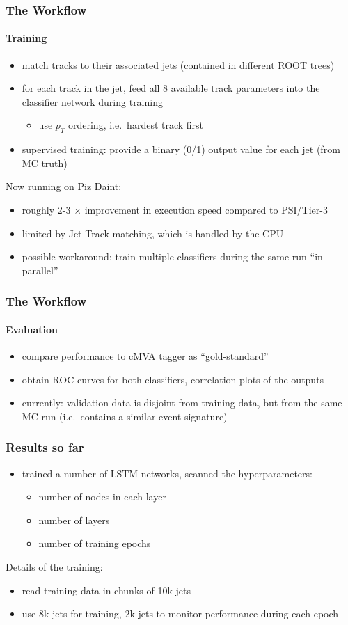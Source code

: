 \documentclass{beamer}
\begin{document}
\begin{frame}
  \frametitle{The Workflow}
  \framesubtitle{Training}
  \begin{itemize}
  \item match tracks to their associated jets (contained in different ROOT trees)
  \item for each track in the jet, feed all 8 available track parameters into the classifier network during training
    \begin{itemize}
      \item use $p_T$ ordering, i.e.~hardest track first
    \end{itemize}
  \item supervised training: provide a binary (0/1) output value for each jet (from MC truth)
  \end{itemize}

  Now running on Piz Daint:
  \begin{itemize}
  \item roughly 2-3 $\times$ improvement in execution speed compared to PSI/Tier-3
  \item limited by Jet-Track-matching, which is handled by the CPU
  \item possible workaround: train multiple classifiers during the same run ``in parallel''
  \end{itemize}
\end{frame}

\begin{frame}
  \frametitle{The Workflow}
  \framesubtitle{Evaluation}
  \begin{itemize}
  \item compare performance to cMVA tagger as ``gold-standard''
  \item obtain ROC curves for both classifiers, correlation plots of the outputs
  \item currently: validation data is disjoint from training data, but from the same MC-run (i.e.~contains a similar event signature)
  \end{itemize}

\end{frame}

\begin{frame}
  \frametitle{Results so far}
  \begin{itemize}
  \item trained a number of LSTM networks, scanned the hyperparameters:
    \begin{itemize}
    \item number of nodes in each layer
    \item number of layers
    \item number of training epochs
    \end{itemize}
  \end{itemize}
  
  Details of the training:
  \begin{itemize}
  \item read training data in chunks of 10k jets
  \item use 8k jets for training, 2k jets to monitor performance during each epoch
  \end{itemize}
\end{frame}
\end{document}
